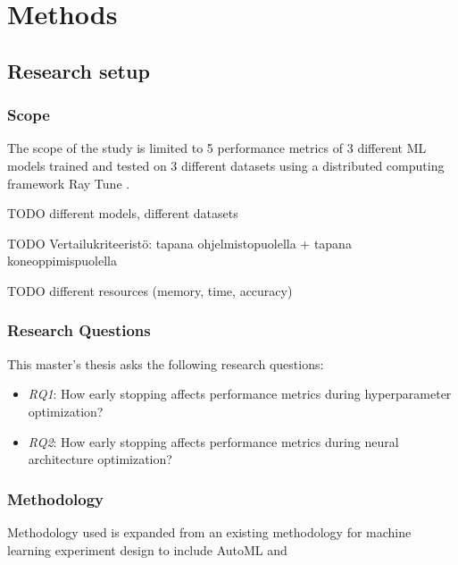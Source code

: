 \chapter{Methods}
\label{chap:methods}

\section{Research setup}
\subsection{Scope}
The scope of the study is limited to 5 performance metrics of 3 different ML models trained and tested on 3 different datasets using a distributed computing framework Ray Tune \parencite{liawTuneResearchPlatform2018}.

TODO different models, different datasets

TODO Vertailukriteeristö: tapana ohjelmistopuolella + tapana koneoppimispuolella

TODO different resources (memory, time, accuracy)



\subsection{Research Questions}
This master's thesis asks the following research questions:
\begin{itemize}
    \item \emph{RQ1}: How early stopping affects performance metrics during hyperparameter optimization?
    \item \emph{RQ2}: How early stopping affects performance metrics during neural architecture optimization?
\end{itemize}

\subsection{Methodology}

Methodology used is expanded from an existing methodology for machine learning experiment design \parencite{fernandez-lozanoMethodologyDesignExperiments2016} to include AutoML and

